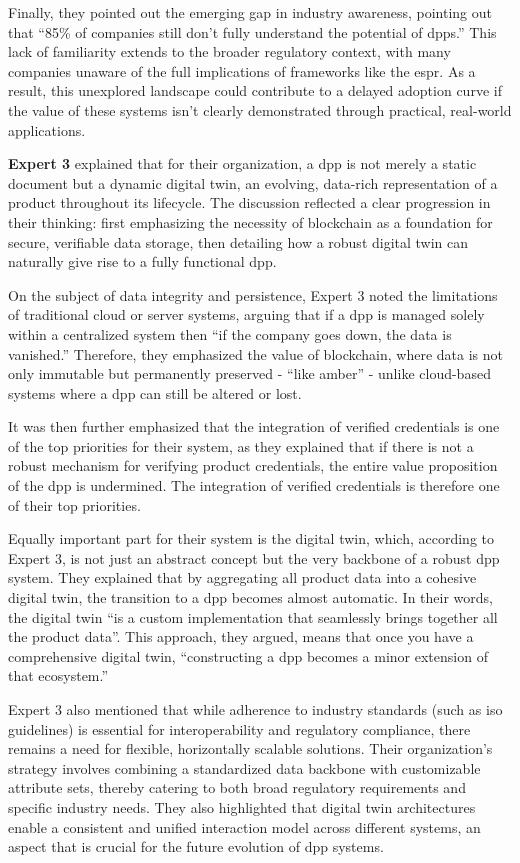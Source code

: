 Finally, they pointed out the emerging gap in industry awareness, pointing out that ``85\% of companies still don’t fully understand the potential of \ac{dpp}s.'' This lack of familiarity extends to the broader regulatory context, with many companies unaware of the full implications of frameworks like the \ac{espr}. As a result, this unexplored landscape could contribute to a delayed adoption curve if the value of these systems isn't clearly demonstrated through practical, real-world applications.

\textbf{Expert 3} explained that for their organization, a \ac{dpp} is not merely a static document but a dynamic digital twin, an evolving, data-rich representation of a product throughout its lifecycle. The discussion reflected a clear progression in their thinking: first emphasizing the necessity of blockchain as a foundation for secure, verifiable data storage, then detailing how a robust digital twin can naturally give rise to a fully functional \ac{dpp}.

On the subject of data integrity and persistence, Expert 3 noted the limitations of traditional cloud or server systems, arguing that if a \ac{dpp} is managed solely within a centralized system then ``if the company goes down, the data is vanished.'' Therefore, they emphasized the value of blockchain, where data is not only immutable but permanently preserved - ``like amber'' - unlike cloud-based systems where a \ac{dpp} can still be altered or lost.

It was then further emphasized that the integration of verified credentials is one of the top priorities for their system, as they explained that if there is not a robust mechanism for verifying product credentials, the entire value proposition of the \ac{dpp} is undermined. The integration of verified credentials is therefore one of their top priorities.

Equally important part for their system is the digital twin, which, according to Expert 3, is not just an abstract concept but the very backbone of a robust \ac{dpp} system. They explained that by aggregating all product data into a cohesive digital twin, the transition to a \ac{dpp} becomes almost automatic. In their words, the digital twin ``is a custom implementation that seamlessly brings together all the product data''. This approach, they argued, means that once you have a comprehensive digital twin, ``constructing a \ac{dpp} becomes a minor extension of that ecosystem.''

Expert 3 also mentioned that while adherence to industry standards (such as \ac{iso} guidelines) is essential for interoperability and regulatory compliance, there remains a need for flexible, horizontally scalable solutions. Their organization’s strategy involves combining a standardized data backbone with customizable attribute sets, thereby catering to both broad regulatory requirements and specific industry needs. They also highlighted that digital twin architectures enable a consistent and unified interaction model across different systems, an aspect that is crucial for the future evolution of \ac{dpp} systems.

